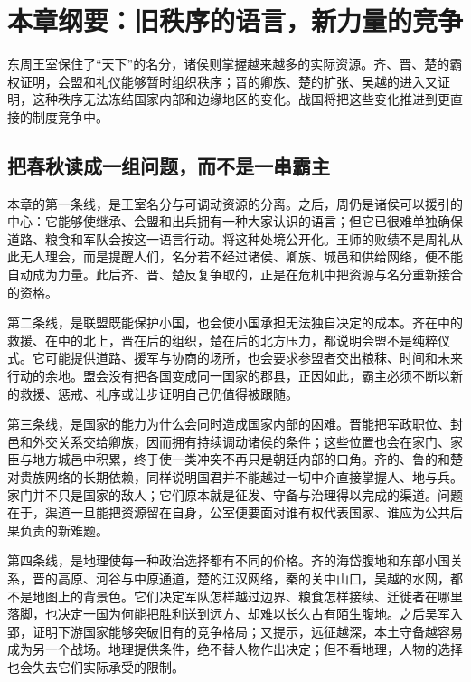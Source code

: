 \section{本章纲要：旧秩序的语言，新力量的竞争}

东周王室保住了“天下”的名分，诸侯则掌握越来越多的实际资源。齐、晋、楚的霸权证明，会盟和礼仪能够暂时组织秩序；晋的卿族、楚的扩张、吴越的进入又证明，这种秩序无法冻结国家内部和边缘地区的变化。战国将把这些变化推进到更直接的制度竞争中。

\subsection{把春秋读成一组问题，而不是一串霸主}

本章的第一条线，是王室名分与可调动资源的分离。之后，周仍是诸侯可以援引的中心：它能够使继承、会盟和出兵拥有一种大家认识的语言；但它已很难单独确保道路、粮食和军队会按这一语言行动。将这种处境公开化。王师的败绩不是周礼从此无人理会，而是提醒人们，名分若不经过诸侯、卿族、城邑和供给网络，便不能自动成为力量。此后齐、晋、楚反复争取的，正是在危机中把资源与名分重新接合的资格。

第二条线，是联盟既能保护小国，也会使小国承担无法独自决定的成本。齐在中的救援、在中的北上，晋在后的组织，楚在后的北方压力，都说明会盟不是纯粹仪式。它可能提供道路、援军与协商的场所，也会要求参盟者交出粮秣、时间和未来行动的余地。盟会没有把各国变成同一国家的郡县，正因如此，霸主必须不断以新的救援、惩戒、礼序或让步证明自己仍值得被跟随。

第三条线，是国家的能力为什么会同时造成国家内部的困难。晋能把军政职位、封邑和外交关系交给卿族，因而拥有持续调动诸侯的条件；这些位置也会在家门、家臣与地方城邑中积累，终于使一类冲突不再只是朝廷内部的口角。齐的、鲁的和楚对贵族网络的长期依赖，同样说明国君并不能越过一切中介直接掌握人、地与兵。家门并不只是国家的敌人；它们原本就是征发、守备与治理得以完成的渠道。问题在于，渠道一旦能把资源留在自身，公室便要面对谁有权代表国家、谁应为公共后果负责的新难题。

第四条线，是地理使每一种政治选择都有不同的价格。齐的海岱腹地和东部小国关系，晋的高原、河谷与中原通道，楚的江汉网络，秦的关中山口，吴越的水网，都不是地图上的背景色。它们决定军队怎样越过边界、粮食怎样接续、迁徙者在哪里落脚，也决定一国为何能把胜利送到远方、却难以长久占有陌生腹地。之后吴军入郢，证明下游国家能够突破旧有的竞争格局；又提示，远征越深，本土守备越容易成为另一个战场。地理提供条件，绝不替人物作出决定；但不看地理，人物的选择也会失去它们实际承受的限制。

